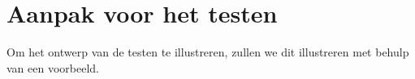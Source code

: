 \section{Aanpak voor het testen}
\label{testen}
Om het ontwerp van de testen te illustreren, zullen we dit illustreren met behulp van een voorbeeld.

